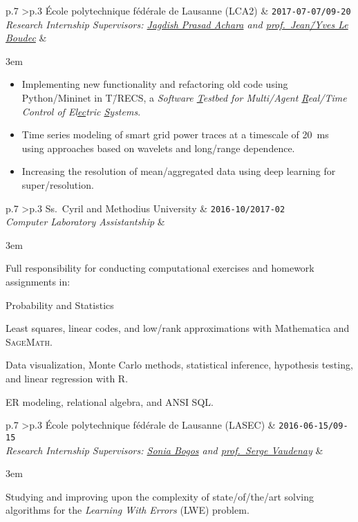 \documentclass[version=last, paper=A4, DIV=12, toc=bibliography]{scrartcl}%
\newcommand*{\WorkEntry}[4]{%
  \noindent%
  \begin{tabular}%
    {%
    p{.7\textwidth-2\tabcolsep}%
    >{\raggedleft\arraybackslash}p{.3\textwidth-2\tabcolsep}%
    }
    \textsf{#2} & \Verb+#1+ \\
    \textit{#3} & \\
    \multicolumn{2}{p{\textwidth-2\tabcolsep}}%
    {%
    \begin{addmargin}{3em}
      \begin{small}
        #4\par
      \end{small}
    \end{addmargin}%
    }
  \end{tabular}%
}
\begin{document}
\WorkEntry%
{2017-07-07/09-20}{École polytechnique fédérale de Lausanne (LCA2)}{%
  Research Internship\newline%
  Supervisors: \href{https://people.epfl.ch/276750}{Jagdish Prasad Achara} and
  \href{https://people.epfl.ch/jean-yves.leboudec}{prof.\ Jean\=/Yves Le
    Boudec}%
}{%
  \begin{itemize}[noitemsep, leftmargin=*]
  \item Implementing new functionality and refactoring old code using
    Python/Mininet in T\=/RECS, a \emph{Software \underline{T}estbed for
      Multi\-/Agent \underline{R}eal\-/Time Control of El\underline{ec}tric
      \underline{S}ystems}.
  \item Time series modeling of smart grid power traces at a timescale of
    \SI{20}{\ms} using approaches based on wavelets and long\-/range dependence.
  \item Increasing the resolution of mean\-/aggregated data using deep learning
    for super\-/resolution.
  \end{itemize}%
}

\WorkEntry%
{2016-10/2017-02}{Ss.\ Cyril and Methodius University}{%
  Computer Laboratory Assistantship%
}{%
  Full responsibility for conducting computational exercises and homework
  assignments in:
  \begin{labeling}{Probability and Statistics}
  \item[Linear Algebra] Least squares, linear codes, and low\-/rank
    approximations with Mathematica\textsuperscript{\textregistered} and
    \textsc{SageMath}.
  \item[Probability and Statistics] Data visualization, Monte Carlo methods,
    statistical inference, hypothesis testing, and linear regression with R.
  \item[Databases] ER modeling, relational algebra, and ANSI SQL\@.
  \end{labeling}%
}

\WorkEntry{2016-06-15/09-15}{École polytechnique fédérale de Lausanne (LASEC)}{%
  Research Internship\newline%
  Supervisors: \href{https://lasec.epfl.ch/~bogos/}{Sonia Bogos} and
  \href{https://lasec.epfl.ch/~vaudenay/}{prof.\ Serge Vaudenay}%
}{%
  Studying and improving upon the complexity of state\-/of\-/the\-/art solving
  algorithms for the \emph{Learning With Errors} (LWE) problem.%
}

\end{document}
